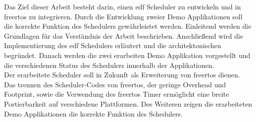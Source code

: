 \documentclass[../EDF Master Thesis.tex]{subfiles}
\begin{document}
    Das Ziel dieser Arbeit besteht darin, einen \ac{edf} Scheduler zu entwickeln und in \ac{freertos} zu integrieren.
    Durch die Entwicklung zweier Demo Applikationen soll die korrekte Funktion des Schedulers gewährleistet werden.
    Einleitend werden die Grundlagen für das Verständnis der Arbeit beschrieben.
    Anschließend wird die Implementierung des \ac{edf} Schedulers erläutert und die architektonischen begründet.
    Danach werden die zwei erarbeiten Demo Applikation vorgestellt und die verschiedenen Status des Schedulers innerhalb der Applikationen.\\
    Der erarbeitete Scheduler soll in Zukunft als Erweiterung von \ac{freertos} dienen.
    Das trennen des Scheduler-Codes von \ac{freertos}, der geringe Overhead und Footprint, sowie die Verwendung des \ac{freertos} Timer ermöglicht eine breite Portierbarkeit auf verschiedene Plattformen.
    Des Weiteren zeigen die erarbeiteten Demo Applikationen die korrekte Funktion des Schedulers.
\end{document}
